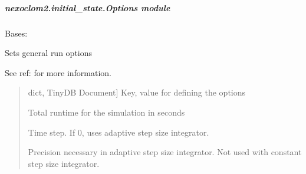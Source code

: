 \documentclass[letterpaper,10pt,english]{sphinxmanual}
\begin{document}
\sphinxstepscope


\subparagraph{nexoclom2.initial\_state.Options module}
\label{\detokenize{nexoclom2/nexoclom2.initial_state.Options:module-nexoclom2.initial_state.Options}}\label{\detokenize{nexoclom2/nexoclom2.initial_state.Options:nexoclom2-initial-state-options-module}}\label{\detokenize{nexoclom2/nexoclom2.initial_state.Options::doc}}

\begin{fulllineitems}
\label{\detokenize{nexoclom2/nexoclom2.initial_state.Options:nexoclom2.initial_state.Options.Options}}
\pysigstartsignatures
\pysiglinewithargsret
{}
{}
{}
\pysigstopsignatures
\sphinxAtStartPar
Bases: {\hyperref[\detokenize{nexoclom2/nexoclom2.initial_state.InputClass:nexoclom2.initial_state.InputClass.InputClass}]{}}

\sphinxAtStartPar
Sets general run options

\sphinxAtStartPar
See ref: for more information.
\begin{quote}\begin{description}
\begin{description}
\sphinxlineitem{\sphinxstylestrong{options}}{[}dict, TinyDB Document{]}
\sphinxAtStartPar
Key, value for defining the options

\end{description}

\begin{description}
\sphinxAtStartPar
Total runtime for the simulation in seconds

\sphinxAtStartPar
Time step. If 0, uses adaptive step size integrator.

\sphinxAtStartPar
Precision necessary in adaptive step size integrator. Not used with
constant step size integrator.


\end{description}
\end{description}
\end{quote}
\end{fulllineitems}
\end{document}

